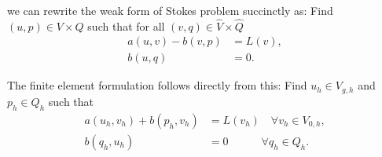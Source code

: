 we can rewrite the weak form of Stokes problem succinctly as:
Find $(u, p) \in V \times Q$ such that for all $(v, q) \in \hat{V} \times \hat{Q}$
\begin{equation}
    \begin{split}
        a(u, v) - b(v, p) &= L(v), \\
        b(u, q) &= 0.
    \end{split}
\end{equation}

The finite element formulation follows directly from this:
Find $u_h \in V_{g, h}$ and $p_h \in Q_h$ such that
\begin{equation}\label{eq:stokes-fem}
    \begin{split}
        a(u_h, v_h) + b(p_h, v_h) &= L(v_h) \quad \forall v_h \in V_{0, h}, \\
        b(q_h, u_h) &= 0 \quad\qquad \forall q_h \in Q_h.
    \end{split}
\end{equation}

